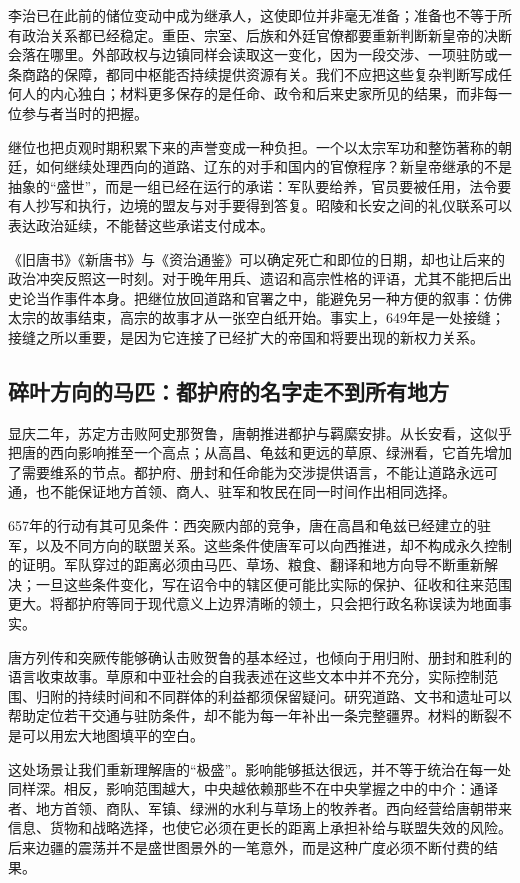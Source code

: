 李治已在此前的储位变动中成为继承人，这使即位并非毫无准备；准备也不等于所有政治关系都已经稳定。重臣、宗室、后族和外廷官僚都要重新判断新皇帝的决断会落在哪里。外部政权与边镇同样会读取这一变化，因为一段交涉、一项驻防或一条商路的保障，都同中枢能否持续提供资源有关。我们不应把这些复杂判断写成任何人的内心独白；材料更多保存的是任命、政令和后来史家所见的结果，而非每一位参与者当时的把握。

继位也把贞观时期积累下来的声誉变成一种负担。一个以太宗军功和整饬著称的朝廷，如何继续处理西向的道路、辽东的对手和国内的官僚程序？新皇帝继承的不是抽象的“盛世”，而是一组已经在运行的承诺：军队要给养，官员要被任用，法令要有人抄写和执行，边境的盟友与对手要得到答复。昭陵和长安之间的礼仪联系可以表达政治延续，不能替这些承诺支付成本。

《旧唐书》《新唐书》与《资治通鉴》可以确定死亡和即位的日期，却也让后来的政治冲突反照这一时刻。对于晚年用兵、遗诏和高宗性格的评语，尤其不能把后出史论当作事件本身。把继位放回道路和官署之中，能避免另一种方便的叙事：仿佛太宗的故事结束，高宗的故事才从一张空白纸开始。事实上，649年是一处接缝；接缝之所以重要，是因为它连接了已经扩大的帝国和将要出现的新权力关系。

\subsection{碎叶方向的马匹：都护府的名字走不到所有地方}
显庆二年，苏定方击败阿史那贺鲁，唐朝推进都护与羁縻安排。从长安看，这似乎把唐的西向影响推至一个高点；从高昌、龟兹和更远的草原、绿洲看，它首先增加了需要维系的节点。都护府、册封和任命能为交涉提供语言，不能让道路永远可通，也不能保证地方首领、商人、驻军和牧民在同一时间作出相同选择。

657年的行动有其可见条件：西突厥内部的竞争，唐在高昌和龟兹已经建立的驻军，以及不同方向的联盟关系。这些条件使唐军可以向西推进，却不构成永久控制的证明。军队穿过的距离必须由马匹、草场、粮食、翻译和地方向导不断重新解决；一旦这些条件变化，写在诏令中的辖区便可能比实际的保护、征收和往来范围更大。将都护府等同于现代意义上边界清晰的领土，只会把行政名称误读为地面事实。

唐方列传和突厥传能够确认击败贺鲁的基本经过，也倾向于用归附、册封和胜利的语言收束故事。草原和中亚社会的自我表述在这些文本中并不充分，实际控制范围、归附的持续时间和不同群体的利益都须保留疑问。研究道路、文书和遗址可以帮助定位若干交通与驻防条件，却不能为每一年补出一条完整疆界。材料的断裂不是可以用宏大地图填平的空白。

这处场景让我们重新理解唐的“极盛”。影响能够抵达很远，并不等于统治在每一处同样深。相反，影响范围越大，中央越依赖那些不在中央掌握之中的中介：通译者、地方首领、商队、军镇、绿洲的水利与草场上的牧养者。西向经营给唐朝带来信息、货物和战略选择，也使它必须在更长的距离上承担补给与联盟失效的风险。后来边疆的震荡并不是盛世图景外的一笔意外，而是这种广度必须不断付费的结果。


